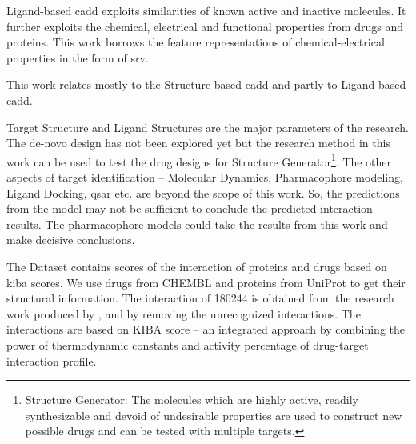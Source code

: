 
Ligand-based \acrshort{cadd} exploits similarities of known active and inactive molecules. It further exploits the chemical, electrical and functional properties from drugs and proteins. This work borrows the feature representations of chemical-electrical properties in the form of \acrfull{srv}.


This work relates mostly to the Structure based \acrshort{cadd} and partly to Ligand-based \acrshort{cadd}. 
\iffalse
The parameters of our work can be associated with \begin{itemize}
    \setlength\parindent{24pt}
    \item Target Structure %
    \item Ligand Structure %
\end{itemize}
\fi
Target Structure and Ligand Structures are the major parameters of the research. The de-novo design has not been explored yet but the research method in this work can be used to test the drug designs for Structure Generator\footnote{Structure Generator: The molecules which are highly active, readily synthesizable and devoid of undesirable properties are used to construct new possible drugs and can be tested with multiple targets.}. The other aspects of target identification -- Molecular Dynamics, Pharmacophore modeling, Ligand Docking, \acrfull{qsar} etc. are beyond the scope of this work. So, the predictions from the model may not be sufficient to conclude the predicted interaction results. The pharmacophore models could take the results from this work and make decisive conclusions. 

\iffalse
(52498, 254)
180244
\fi
The Dataset contains scores of the interaction of proteins and drugs based on \acrshort{kiba} scores. We use  drugs from CHEMBL and  proteins from UniProt to get their structural information. The interaction of 180244 is obtained from the research work produced by \citep{Tang2013}, and by removing the unrecognized interactions. The interactions are based on KIBA score -- an integrated approach by combining the power of thermodynamic constants and activity percentage of drug-target interaction profile.

